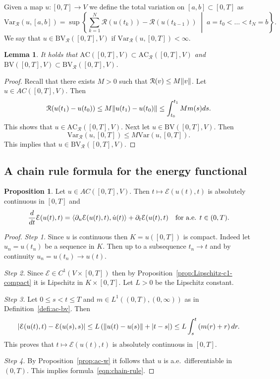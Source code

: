 \documentclass[letterpaper,oneside]{amsart}
\numberwithin{equation}{section}
\newtheorem{lemma}[theorem]{Lemma}
\theoremstyle{definition}
\newtheorem{prop}{Proposition}[section]
\DeclarePairedDelimiter{\norm}{\lVert}{\rVert}
\DeclarePairedDelimiter{\dual}{\langle}{\rangle}
\begin{document}
Given a map $u\colon[0,T]\to V$ we define the total variation on $[a,b]\subset[0,T]$ as
\begin{equation*}
\text{Var}_\mathcal{R}(u,[a,b])=\sup\left\{\sum_{k=1}^N\mathcal{R}(u(t_k))-\mathcal{R}(u(t_{k-1}))\;\middle|\;a=t_0<\dots<t_N=b\right\}.
\end{equation*}
We say that $u\in\text{BV}_\mathcal{R}([0,T],V)$ if $\text{Var}_\mathcal{R}(u,[0,T])<\infty$.
\begin{lemma}
It holds that $\text{AC}([0,T],V)\subset\text{AC}_\mathcal{R}([0,T],V)$ and $\text{BV}([0,T],V)\subset\text{BV}_\mathcal{R}([0,T],V)$.
\end{lemma}
\begin{proof}
Recall that there exists $M>0$ such that $\mathcal{R}(v)\le M\norm{v}$. Let $u\in AC([0,T],V)$. Then
\[
\mathcal{R}(u(t_1)-u(t_0))\le M\norm{u(t_1)-u(t_0)}\le\int_{t_0}^{t_1}Mm(s)ds.
\]
This shows that $u\in\text{AC}_\mathcal{R}([0,T],V)$. Next let $u\in\text{BV}([0,T],V)$. Then
\[
\text{Var}_\mathcal{R}(u,[0,T])\le M\text{Var}(u,[0,T]).
\]
This implies that $u\in\text{BV}_\mathcal{R}([0,T],V)$.
\end{proof}

\subsection{A chain rule formula for the energy functional}

\begin{prop}
Let $u\in AC([0,T],V)$. Then $t\mapsto\mathcal{E}(u(t),t)$ is absolutely continuous in $[0,T]$ and
\begin{equation}
\label{eqn:chain-rule}
\frac{d}{dt}\mathcal{E}(u(t),t)=\dual{\partial_u\mathcal{E}(u(t),t),\dot u(t)}+\partial_t\mathcal{E}(u(t),t)\quad\text{for a.e. $t\in(0,T)$}.
\end{equation}
\end{prop}
\begin{proof}
\emph{Step 1.} Since $u$ is continuous then $K=u([0,T])$ is compact. Indeed let $u_n=u(t_n)$ be a sequence in $K$. Then up to a subsequence $t_n\to t$ and by continuity $u_n=u(t_n)\to u(t)$.

\emph{Step 2.} Since $\mathcal{E}\in C^1(V\times[0,T])$ then by Proposition~\ref{prop:Lipschitz-c1-compact} it is Lipschitz in $K\times[0,T]$. Let $L>0$ be the Lipschitz constant.

\emph{Step 3.} Let $0\le s<t\le T$ and $m\in L^1((0,T),(0,\infty))$ as in Definition~\ref{defi:ac-bv}. Then
\begin{equation*}
|\mathcal{E}(u(t),t)-\mathcal{E}(u(s),s)|\le L\left(\norm{u(t)-u(s)}+|t-s|\right)\le L\int_s^t\left(m(r)+r\right)dr.
\end{equation*}
This proves that $t\mapsto\mathcal{E}(u(t),t)$ is absolutely continuous in $[0,T]$.

\emph{Step 4.} By Proposition~\ref{prop:ac-w} it follows that $u$ is a.e.\ differentiable in $(0,T)$. This implies formula~\eqref{eqn:chain-rule}.
\end{proof}
\end{document}
